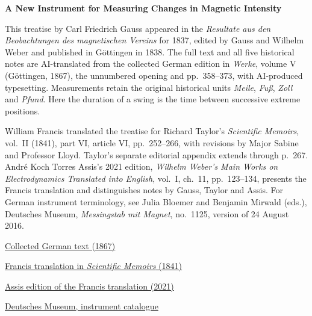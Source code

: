 \clearpage
\thispagestyle{empty}
\begin{center}\Large\textbf{A New Instrument for Measuring Changes in Magnetic Intensity}\end{center}

This treatise by Carl Friedrich Gauss appeared in the \textit{Resultate aus den Beobachtungen des magnetischen Vereins} for 1837, edited by Gauss and Wilhelm Weber and published in Göttingen in 1838. The full text and all five historical notes are AI-translated from the collected German edition in \textit{Werke}, volume V (Göttingen, 1867), the unnumbered opening and pp.~358--373, with AI-produced typesetting. Measurements retain the original historical units \textit{Meile}, \textit{Fuß}, \textit{Zoll} and \textit{Pfund}. Here the duration of a swing is the time between successive extreme positions.

\medskip\noindent
William Francis translated the treatise for Richard Taylor's \textit{Scientific Memoirs}, vol.~II (1841), part VI, article VI, pp.~252--266, with revisions by Major Sabine and Professor Lloyd. Taylor's separate editorial appendix extends through p.~267. André Koch Torres Assis's 2021 edition, \textit{Wilhelm Weber's Main Works on Electrodynamics Translated into English}, vol.~I, ch.~11, pp.~123--134, presents the Francis translation and distinguishes notes by Gauss, Taylor and Assis. For German instrument terminology, see Julia Bloemer and Benjamin Mirwald (eds.), Deutsches Museum, \textit{Messingstab mit Magnet}, no.~1125, version of 24 August 2016.

\medskip\noindent
\href{https://gdz.sub.uni-goettingen.de/id/PPN236006339}{Collected German text (1867)}\par
\noindent\href{https://archive.org/details/s1id11857360}{Francis translation in \textit{Scientific Memoirs} (1841)}\par
\noindent\href{https://www.ifi.unicamp.br/~assis/Weber-in-English-Vol-1.pdf\#page=126}{Assis edition of the Francis translation (2021)}\par
\noindent\href{https://digital.deutsches-museum.de/projekte/gruendungssammlung/detail/1125/}{Deutsches Museum, instrument catalogue}
\clearpage
